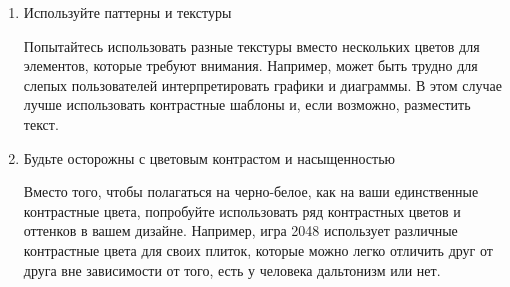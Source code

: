 \begin{enumerate}
\item Используйте паттерны и текстуры

Попытайтесь использовать разные текстуры вместо нескольких цветов для элементов, которые требуют внимания. Например, может быть трудно для слепых пользователей интерпретировать графики и диаграммы. В этом случае лучше использовать контрастные шаблоны и, если возможно, разместить текст.

\noindent
\begin{minipage}{\linewidth}
\end{minipage}
\bigskip

\item Будьте осторожны с цветовым контрастом и насыщенностью

Вместо того, чтобы полагаться на черно-белое, как на ваши единственные контрастные цвета, попробуйте использовать ряд контрастных цветов и оттенков в вашем дизайне. Например, игра 2048 использует различные контрастные цвета для своих плиток, которые можно легко отличить друг от друга вне зависимости от того, есть у человека дальтонизм или нет.

\noindent
\begin{minipage}{\linewidth}
\end{minipage}
\bigskip


\end{enumerate}
